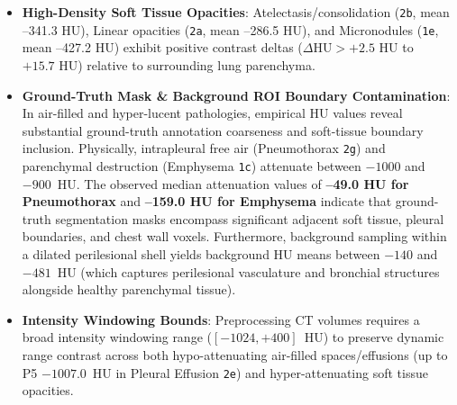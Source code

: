 \documentclass[11pt,a4paper]{article}
\begin{document}
\begin{itemize}
    \item \textbf{High-Density Soft Tissue Opacities}: Atelectasis/consolidation (\texttt{2b}, mean --341.3 HU), Linear opacities (\texttt{2a}, mean --286.5 HU), and Micronodules (\texttt{1e}, mean --427.2 HU) exhibit positive contrast deltas ($\Delta\text{HU} > +2.5\text{ HU}$ to $+15.7\text{ HU}$) relative to surrounding lung parenchyma.
    \item \textbf{Ground-Truth Mask \& Background ROI Boundary Contamination}: In air-filled and hyper-lucent pathologies, empirical HU values reveal substantial ground-truth annotation coarseness and soft-tissue boundary inclusion. Physically, intrapleural free air (Pneumothorax \texttt{2g}) and parenchymal destruction (Emphysema \texttt{1c}) attenuate between $-1000$ and $-900$~HU. The observed median attenuation values of \textbf{--49.0 HU for Pneumothorax} and \textbf{--159.0 HU for Emphysema} indicate that ground-truth segmentation masks encompass significant adjacent soft tissue, pleural boundaries, and chest wall voxels. Furthermore, background sampling within a dilated perilesional shell yields background HU means between $-140$ and $-481$~HU (which captures perilesional vasculature and bronchial structures alongside healthy parenchymal tissue).
    \item \textbf{Intensity Windowing Bounds}: Preprocessing CT volumes requires a broad intensity windowing range ($\left[-1024, +400\right]$~HU) to preserve dynamic range contrast across both hypo-attenuating air-filled spaces/effusions (up to P5 $-1007.0$~HU in Pleural Effusion \texttt{2e}) and hyper-attenuating soft tissue opacities.
\end{itemize}
\end{document}
